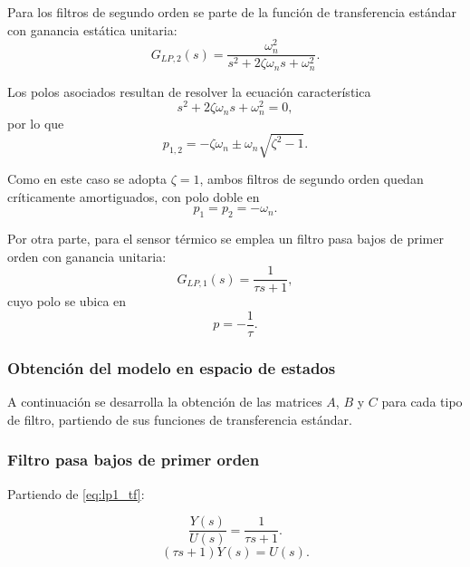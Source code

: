 \documentclass[12pt, a4paper,journal, onecolumn, compsoc]{IEEEtran}
\begin{document}
Para los filtros de segundo orden se parte de la función de transferencia estándar con ganancia estática unitaria:
\begin{equation}
    G_{LP,2}(s)=\frac{\omega_n^2}{s^2+2\zeta\omega_n s+\omega_n^2}.
    \label{eq:lp2_tf}
\end{equation}

Los polos asociados resultan de resolver la ecuación característica
\begin{equation}
    s^2+2\zeta\omega_n s+\omega_n^2=0,
\end{equation}
por lo que
\begin{equation}
    p_{1,2}=-\zeta\omega_n\pm\omega_n\sqrt{\zeta^2-1}.
\end{equation}

Como en este caso se adopta $\zeta=1$, ambos filtros de segundo orden quedan críticamente amortiguados, con polo doble en
\begin{equation}
    p_1=p_2=-\omega_n.
\end{equation}

Por otra parte, para el sensor térmico se emplea un filtro pasa bajos de primer orden con ganancia unitaria:
\begin{equation}
    G_{LP,1}(s)=\frac{1}{\tau s+1},
    \label{eq:lp1_tf}
\end{equation}
cuyo polo se ubica en
\begin{equation}
    p=-\frac{1}{\tau}.
\end{equation}

\subsubsection*{Obtención del modelo en espacio de estados}

A continuación se desarrolla la obtención de las matrices $A$, $B$ y $C$ para cada tipo de filtro, partiendo de sus funciones de transferencia estándar.

\subsubsection*{Filtro pasa bajos de primer orden}

Partiendo de \eqref{eq:lp1_tf}:

\begin{equation}
    \frac{Y(s)}{U(s)}=\frac{1}{\tau s+1}.
\end{equation}
\begin{equation}
    (\tau s+1)Y(s)=U(s).
\end{equation}
\end{document}
